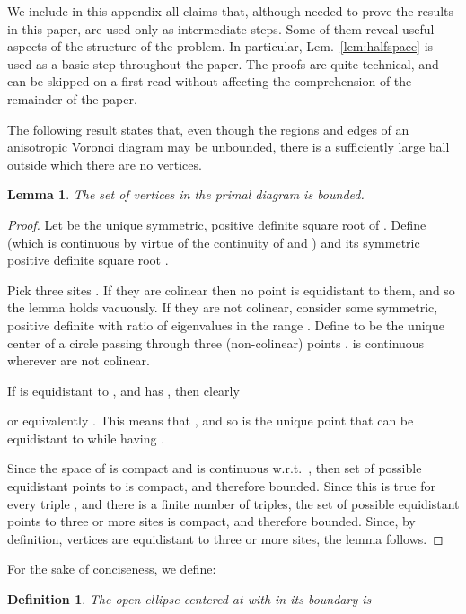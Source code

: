 \documentclass[11pt]{article}
\newtheorem{lemma}[theorem]{Lemma}
\newtheorem{definition}[theorem]{Definition}
\begin{document}
We include in this appendix all claims that, 
although needed to prove the results in this paper, 
are used only as intermediate steps. 
Some of them reveal useful aspects of the structure of the problem. 
In particular, Lem.~\ref{lem:halfspace} is used as a basic step throughout the
paper. 
The proofs are quite technical, and can be skipped on a first read without
affecting the comprehension of the remainder of the paper. 


The following result 
states that, even though the regions and edges of an 
anisotropic Voronoi diagram may be unbounded, there is a sufficiently
large ball outside which there are no vertices. 

\begin{lemma}\label{lem:bounded-vertices}
The set of vertices in the primal diagram  is bounded. 
\end{lemma}
\begin{proof}
Let  be the unique symmetric, positive definite square root of . 
Define  
(which is continuous by virtue of the continuity of  and ) 
and its symmetric positive definite square root . 

Pick three sites . If they are colinear then no point is 
equidistant to them, and so the lemma holds vacuously.  
If they are not colinear, 
consider some  symmetric,
positive definite with ratio of eigenvalues in the range . 
Define   to be the {unique} center
of a circle passing through three (non-colinear) points .  is
continuous wherever  are not colinear. 

If  is equidistant to , and has , then clearly 

or equivalently . 
This means that , 
and so  is the unique point
that can be equidistant to  while having .

Since the space of  is compact and  is continuous w.r.t.\ , then set of possible equidistant points to
 is compact, and therefore bounded. 
Since this is true for every triple , and there is a
finite number of triples, the set of possible equidistant points to three or
more sites is compact, and therefore bounded. 
Since, by definition, vertices are equidistant to three or more sites, the lemma follows. 
\end{proof}



For the sake of conciseness, we define: \begin{definition}
	The open ellipse centered at  with  in its boundary is 
\end{definition}
\end{document}
